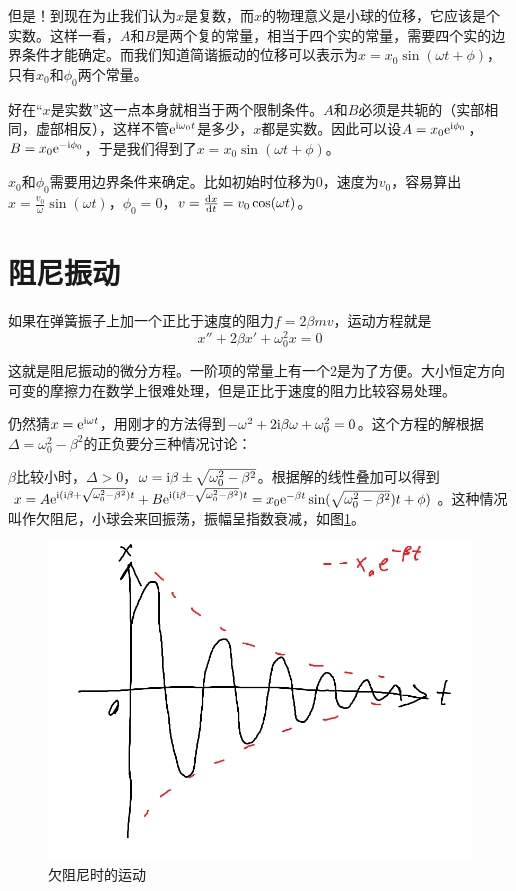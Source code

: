 但是！到现在为止我们认为$x$是复数，而$x$的物理意义是小球的位移，它应该是个实数。这样一看，$A$和$B$是两个复的常量，相当于四个实的常量，需要四个实的边界条件才能确定。而我们知道简谐振动的位移可以表示为$x=x_0 \sin(\omega t+\phi)$，只有$x_0$和$\phi_0$两个常量。

好在“$x$是实数”这一点本身就相当于两个限制条件。$A$和$B$必须是共轭的（实部相同，虚部相反），这样不管$\mathrm{e}^{\mathrm{i} \omega_0 t}$是多少，$x$都是实数。因此可以设$A=x_0 \mathrm{e}^{\mathrm{i} \phi_0}$，$B=x_0 \mathrm{e}^{-\mathrm{i} \phi_0}$，于是我们得到了$x=x_0 \sin(\omega t+\phi)$。

$x_0$和$\phi_0$需要用边界条件来确定。比如初始时位移为$0$，速度为$v_0$，容易算出$x=\frac{v_0}{\omega} \sin(\omega t)$，$\phi_0=0$，$v=\frac{\mathop{}\!\mathrm{d} x}{\mathop{}\!\mathrm{d} t}=v_0 \cos(\omega t)$。
\section{阻尼振动}
如果在弹簧振子上加一个正比于速度的阻力$f=2 \beta m v$，运动方程就是
\begin{equation*}
x''+2 \beta x'+\omega_0^2 x=0
\end{equation*}

这就是阻尼振动的微分方程。一阶项的常量上有一个2是为了方便。大小恒定方向可变的摩擦力在数学上很难处理，但是正比于速度的阻力比较容易处理。

仍然猜$x=\mathrm{e}^{\mathrm{i} \omega t}$，用刚才的方法得到$-\omega^2+2 \mathrm{i} \beta \omega+\omega_0^2=0$。这个方程的解根据$\Delta=\omega_0^2-\beta^2$的正负要分三种情况讨论：

$\beta$比较小时，$\Delta>0$，$\omega=\mathrm{i} \beta \pm \sqrt{\omega_0^2-\beta^2}$。根据解的线性叠加可以得到$x=A \mathrm{e}^{\mathrm{i} (\mathrm{i} \beta+\sqrt{\omega_0^2-\beta^2}) t}+B \mathrm{e}^{\mathrm{i} (\mathrm{i} \beta-\sqrt{\omega_0^2-\beta^2}) t}=x_0 \mathrm{e}^{-\beta t} \sin(\sqrt{\omega_0^2-\beta^2}) t+\phi)$。这种情况叫作欠阻尼，小球会来回振荡，振幅呈指数衰减，如图\ref{fig-under-dump}。
\begin{figure}[htb]
\centering
\includegraphics[scale=0.5]{fig/under-dump}
\caption{欠阻尼时的运动}
\label{fig-under-dump}
\end{figure}

